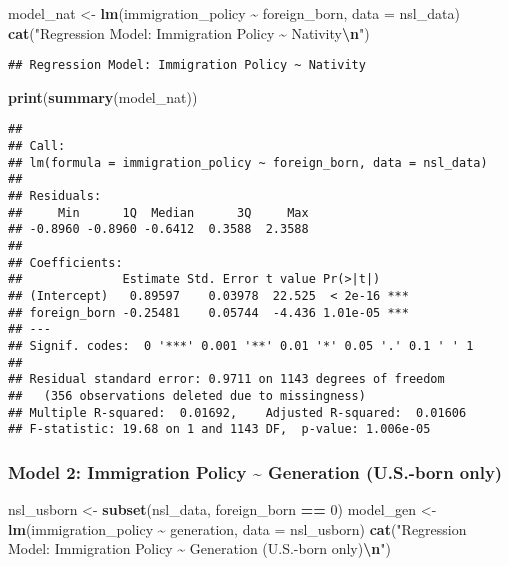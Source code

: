 \documentclass[
]{article}
\newenvironment{Shaded}{\begin{snugshade}}{\end{snugshade}}
\newcommand{\AttributeTok}[1]{\textcolor[rgb]{0.13,0.29,0.53}{#1}}
\newcommand{\DecValTok}[1]{\textcolor[rgb]{0.00,0.00,0.81}{#1}}
\newcommand{\FunctionTok}[1]{\textcolor[rgb]{0.13,0.29,0.53}{\textbf{#1}}}
\newcommand{\NormalTok}[1]{#1}
\newcommand{\OtherTok}[1]{\textcolor[rgb]{0.56,0.35,0.01}{#1}}
\newcommand{\SpecialCharTok}[1]{\textcolor[rgb]{0.81,0.36,0.00}{\textbf{#1}}}
\newcommand{\StringTok}[1]{\textcolor[rgb]{0.31,0.60,0.02}{#1}}
\begin{document}
\begin{Shaded}
\begin{Highlighting}[]
\NormalTok{model\_nat }\OtherTok{\textless{}{-}} \FunctionTok{lm}\NormalTok{(immigration\_policy }\SpecialCharTok{\textasciitilde{}}\NormalTok{ foreign\_born, }\AttributeTok{data =}\NormalTok{ nsl\_data)}
\FunctionTok{cat}\NormalTok{(}\StringTok{"Regression Model: Immigration Policy \textasciitilde{} Nativity}\SpecialCharTok{\textbackslash{}n}\StringTok{"}\NormalTok{)}
\end{Highlighting}
\end{Shaded}

\begin{verbatim}
## Regression Model: Immigration Policy ~ Nativity
\end{verbatim}

\begin{Shaded}
\begin{Highlighting}[]
\FunctionTok{print}\NormalTok{(}\FunctionTok{summary}\NormalTok{(model\_nat))}
\end{Highlighting}
\end{Shaded}

\begin{verbatim}
## 
## Call:
## lm(formula = immigration_policy ~ foreign_born, data = nsl_data)
## 
## Residuals:
##     Min      1Q  Median      3Q     Max 
## -0.8960 -0.8960 -0.6412  0.3588  2.3588 
## 
## Coefficients:
##              Estimate Std. Error t value Pr(>|t|)    
## (Intercept)   0.89597    0.03978  22.525  < 2e-16 ***
## foreign_born -0.25481    0.05744  -4.436 1.01e-05 ***
## ---
## Signif. codes:  0 '***' 0.001 '**' 0.01 '*' 0.05 '.' 0.1 ' ' 1
## 
## Residual standard error: 0.9711 on 1143 degrees of freedom
##   (356 observations deleted due to missingness)
## Multiple R-squared:  0.01692,    Adjusted R-squared:  0.01606 
## F-statistic: 19.68 on 1 and 1143 DF,  p-value: 1.006e-05
\end{verbatim}

\subsubsection{Model 2: Immigration Policy \textasciitilde{} Generation
(U.S.-born
only)}\label{model-2-immigration-policy-generation-u.s.-born-only}

\begin{Shaded}
\begin{Highlighting}[]
\NormalTok{nsl\_usborn }\OtherTok{\textless{}{-}} \FunctionTok{subset}\NormalTok{(nsl\_data, foreign\_born }\SpecialCharTok{==} \DecValTok{0}\NormalTok{)}
\NormalTok{model\_gen }\OtherTok{\textless{}{-}} \FunctionTok{lm}\NormalTok{(immigration\_policy }\SpecialCharTok{\textasciitilde{}}\NormalTok{ generation, }\AttributeTok{data =}\NormalTok{ nsl\_usborn)}
\FunctionTok{cat}\NormalTok{(}\StringTok{"Regression Model: Immigration Policy \textasciitilde{} Generation (U.S.{-}born only)}\SpecialCharTok{\textbackslash{}n}\StringTok{"}\NormalTok{)}
\end{Highlighting}
\end{Shaded}
\end{document}
